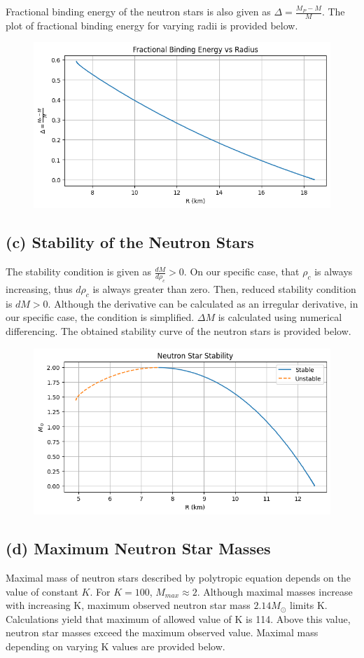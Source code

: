 \documentclass[aps,twocolumn,showpacs,preprintnumbers,nofootinbib,prl,superscriptaddress,groupedaddress]{revtex4-2}
\begin{document}
Fractional binding energy of the neutron stars is also given as $\Delta=\frac{M_P-M}{M}$. The plot of fractional binding energy for varying radii is provided below.

\begin{figure}[!htb]
	\centering
	\includegraphics[width=0.5\linewidth]{Plots/einstein-part-b}
	\caption{}
	\label{fig:einstein-part-b}
\end{figure}

\subsection{(c) Stability of the Neutron Stars}

The stability condition is given as $\frac{dM}{d\rho_c} > 0$. On our specific case, that $\rho_c$ is always increasing, thus $d\rho_c$ is always greater than zero. Then, reduced stability condition is $dM > 0$. Although the derivative can be calculated as an irregular derivative, in our specific case, the condition is simplified. $\Delta M$ is calculated using numerical differencing. The obtained stability curve of the neutron stars is provided below.

\begin{figure}[!htb]
	\centering
	\includegraphics[width=0.5\linewidth]{Plots/einstein-part-c}
	\caption{}
	\label{fig:einstein-part-c}
\end{figure}

\subsection{(d) Maximum Neutron Star Masses}

Maximal mass of neutron stars described by polytropic equation depends on the value of constant $K$. For $K = 100$, $M_{max} \approx 2$. Although maximal masses increase with increasing K, maximum observed neutron star mass $2.14M_\odot$ limits K. Calculations yield that maximum of allowed value of K is 114. Above this value, neutron star masses exceed the maximum observed value. Maximal mass depending on varying K values are provided below.
\end{document}
